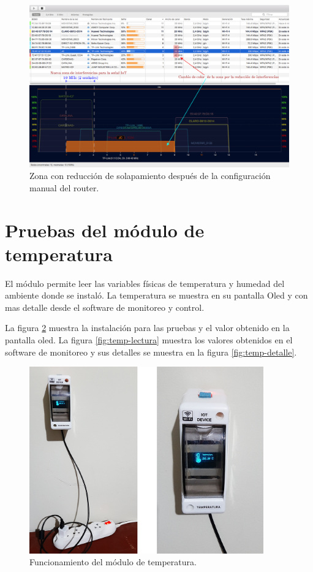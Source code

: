 
\begin{landscape} %
\begin{figure}[htpb]
\centering 
\includegraphics[width=1.5\textwidth]{./Figures/wifi/06.png}
\caption{Zona con reducción de solapamiento después de la configuración manual del router.}
\label{fig:test06}
\end{figure}
\end{landscape} %


\section{Pruebas del módulo de temperatura}

El módulo permite leer las variables físicas de temperatura y humedad del ambiente donde se instaló. La temperatura se muestra en su pantalla Oled y con mas detalle desde el software de monitoreo y control.

La figura \ref{fig:test-temp} muestra la instalación para las pruebas y el valor obtenido en la pantalla oled. La figura \ref{fig:temp-lectura} muestra los valores obtenidos en el software de monitoreo y sus detalles se muestra en la figura \ref{fig:temp-detalle}.

\begin{figure}[htpb]
\centering 
\includegraphics[width=0.9\textwidth]{./Figures/test/temp/test-temp.png}
\caption{Funcionamiento del módulo de temperatura.}
\label{fig:test-temp}
\end{figure}

